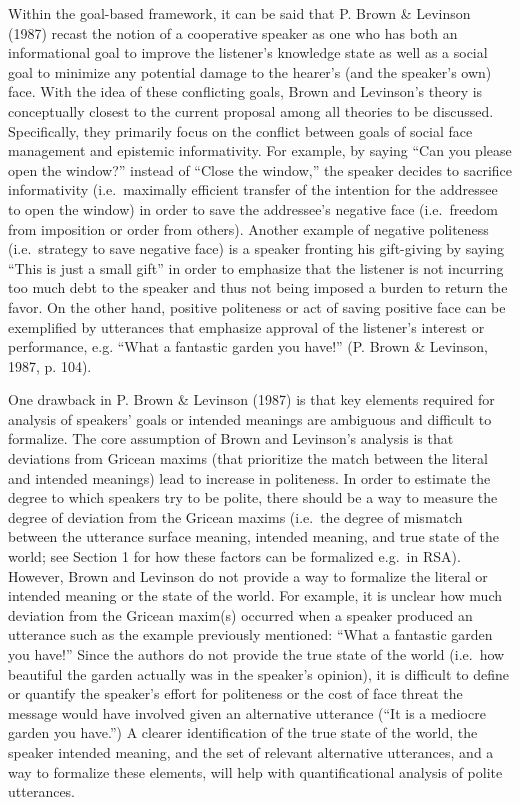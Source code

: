 \documentclass[oneside]{report}
\begin{document}
Within the goal-based framework, it can be said that P. Brown \&
Levinson (1987) recast the notion of a cooperative speaker as one who
has both an informational goal to improve the listener's knowledge state
as well as a social goal to minimize any potential damage to the
hearer's (and the speaker's own) face. With the idea of these
conflicting goals, Brown and Levinson's theory is conceptually closest
to the current proposal among all theories to be discussed.
Specifically, they primarily focus on the conflict between goals of
social face management and epistemic informativity. For example, by
saying ``Can you please open the window?'' instead of ``Close the
window,'' the speaker decides to sacrifice informativity (i.e.~maximally
efficient transfer of the intention for the addressee to open the
window) in order to save the addressee's negative face (i.e.~freedom
from imposition or order from others). Another example of negative
politeness (i.e.~strategy to save negative face) is a speaker fronting
his gift-giving by saying ``This is just a small gift'' in order to
emphasize that the listener is not incurring too much debt to the
speaker and thus not being imposed a burden to return the favor. On the
other hand, positive politeness or act of saving positive face can be
exemplified by utterances that emphasize approval of the listener's
interest or performance, e.g. ``What a fantastic garden you have!'' (P.
Brown \& Levinson, 1987, p. 104).

One drawback in P. Brown \& Levinson (1987) is that key elements
required for analysis of speakers' goals or intended meanings are
ambiguous and difficult to formalize. The core assumption of Brown and
Levinson's analysis is that deviations from Gricean maxims (that
prioritize the match between the literal and intended meanings) lead to
increase in politeness. In order to estimate the degree to which
speakers try to be polite, there should be a way to measure the degree
of deviation from the Gricean maxims (i.e.~the degree of mismatch
between the utterance surface meaning, intended meaning, and true state
of the world; see Section 1 for how these factors can be formalized
e.g.~in RSA). However, Brown and Levinson do not provide a way to
formalize the literal or intended meaning or the state of the world. For
example, it is unclear how much deviation from the Gricean maxim(s)
occurred when a speaker produced an utterance such as the example
previously mentioned: ``What a fantastic garden you have!'' Since the
authors do not provide the true state of the world (i.e.~how beautiful
the garden actually was in the speaker's opinion), it is difficult to
define or quantify the speaker's effort for politeness or the cost of
face threat the message would have involved given an alternative
utterance (``It is a mediocre garden you have.'') A clearer
identification of the true state of the world, the speaker intended
meaning, and the set of relevant alternative utterances, and a way to
formalize these elements, will help with quantificational analysis of
polite utterances.
\end{document}
